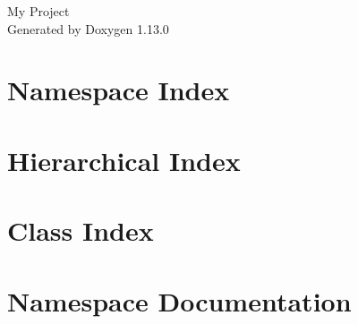 \documentclass[twoside]{book}
\newcommand{\+}{\discretionary{\mbox{\scriptsize$\hookleftarrow$}}{}{}}
\newcommand{\clearemptydoublepage}{%
    \newpage{\pagestyle{empty}\cleardoublepage}%
  }
\begin{document}
  \raggedbottom
    \hypersetup{pageanchor=false,
                bookmarksnumbered=true,
                pdfencoding=unicode
               }
  \begin{titlepage}
  \vspace*{7cm}
  \begin{center}%
  {\Large My Project}\\
  \vspace*{1cm}
  {\large Generated by Doxygen 1.13.0}\\
  \end{center}
  \end{titlepage}
  \clearemptydoublepage
  \tableofcontents
  \clearemptydoublepage
  \hypersetup{pageanchor=true}
\chapter{Namespace Index}

\chapter{Hierarchical Index}

\chapter{Class Index}

\chapter{Namespace Documentation}






\end{document}
